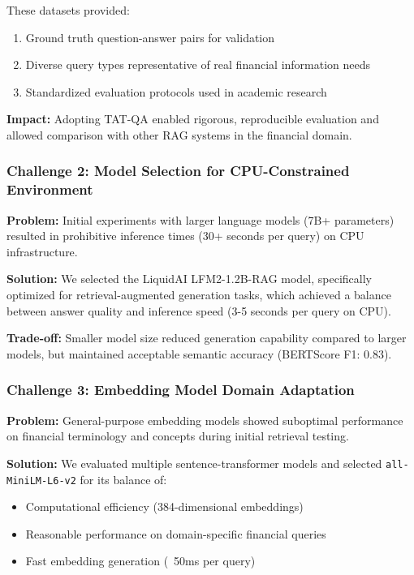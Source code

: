 These datasets provided:
\begin{enumerate}
    \item Ground truth question-answer pairs for validation
    \item Diverse query types representative of real financial information needs
    \item Standardized evaluation protocols used in academic research
\end{enumerate}

\textbf{Impact:} Adopting TAT-QA enabled rigorous, reproducible evaluation and allowed comparison with other RAG systems in the financial domain.

\subsubsection{Challenge 2: Model Selection for CPU-Constrained Environment}

\textbf{Problem:} Initial experiments with larger language models (7B+ parameters) resulted in prohibitive inference times (30+ seconds per query) on CPU infrastructure.

\textbf{Solution:} We selected the LiquidAI LFM2-1.2B-RAG model, specifically optimized for retrieval-augmented generation tasks, which achieved a balance between answer quality and inference speed (3-5 seconds per query on CPU).

\textbf{Trade-off:} Smaller model size reduced generation capability compared to larger models, but maintained acceptable semantic accuracy (BERTScore F1: 0.83).

\subsubsection{Challenge 3: Embedding Model Domain Adaptation}

\textbf{Problem:} General-purpose embedding models showed suboptimal performance on financial terminology and concepts during initial retrieval testing.

\textbf{Solution:} We evaluated multiple sentence-transformer models and selected \texttt{all-MiniLM-L6-v2} for its balance of:
\begin{itemize}
    \item Computational efficiency (384-dimensional embeddings)
    \item Reasonable performance on domain-specific financial queries
    \item Fast embedding generation (~50ms per query)
\end{itemize}

